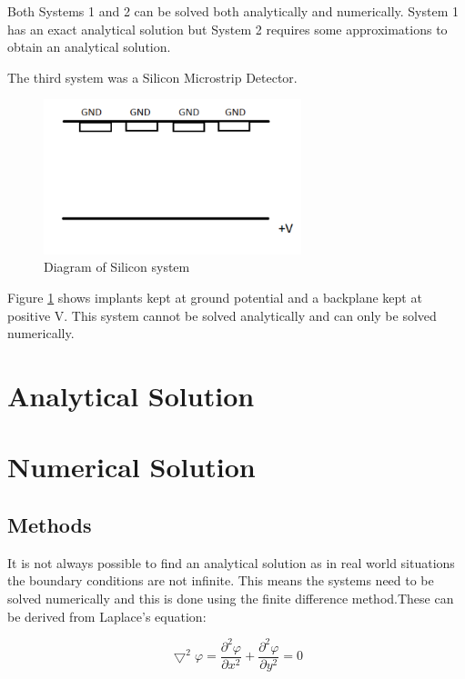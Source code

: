 \documentclass{article}
\begin{document}
Both Systems 1 and 2 can be solved both analytically and numerically. System 1 has an exact analytical solution but System 2 requires some approximations to obtain an analytical solution.

The third system was a Silicon Microstrip Detector.

\begin{figure}[H]
\centering
\includegraphics[width=75mm]{Silicon.pdf}
\caption{Diagram of Silicon system}
\label{fig:Silicon}
\end{figure}

Figure \ref{fig:Silicon} shows implants kept at ground potential and a backplane kept at positive V. This system cannot be solved analytically and can only be solved numerically.


\section{Analytical Solution}



\section{Numerical Solution}


\subsection{Methods}



It is not always possible to find an analytical solution as in real world
situations the boundary conditions are not infinite. This means the systems
need to be solved numerically and this is done using the finite difference
method.These can be derived from Laplace's equation:

\begin{equation}\bigtriangledown ^{2}\varphi =\frac{\partial ^{2}\varphi }{\partial x^{2}} + \frac{\partial ^{2}\varphi }{\partial y^{2}}=0 \end{equation}
\end{document}
